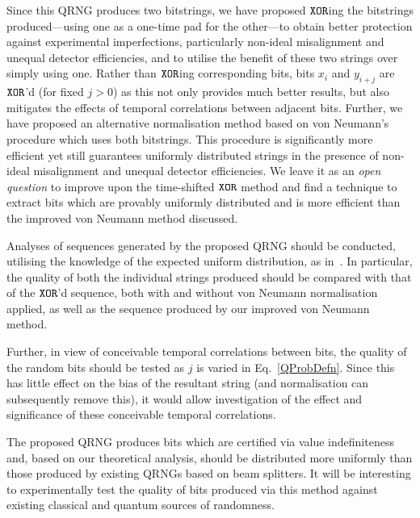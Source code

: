 \documentclass{mscs}
\begin{document}
Since this QRNG produces two bitstrings, we have proposed ${\tt XOR}$ing the bitstrings produced---using one as a one-time pad for the other---to obtain better protection against experimental imperfections, particularly non-ideal misalignment and unequal detector efficiencies, and to utilise the benefit of these two strings over simply using one. Rather than ${\tt XOR}$ing corresponding bits, bits $x_i$ and $y_{i+j}$ are ${\tt XOR}$'d (for fixed $j>0$) as this not only provides much better results, but also mitigates the effects of temporal correlations between adjacent bits. Further, we have proposed an alternative normalisation method based on von Neumann's procedure which uses both bitstrings. This procedure is significantly more efficient yet still guarantees uniformly distributed strings in the presence of non-ideal misalignment and unequal detector efficiencies.
We leave it as an \emph{open question} to improve upon the time-shifted ${\tt XOR}$ method and find a technique to extract bits which are provably uniformly distributed  and is more efficient than the improved von Neumann method discussed.

Analyses of sequences generated by the proposed QRNG should be conducted, utilising the knowledge of the expected uniform distribution, as in~\citet{PhysRevA.82.022102}. In particular, the quality of both the individual strings produced should be compared with that of the ${\tt XOR}$'d sequence, both with and without von Neumann normalisation applied, as well as the sequence produced by our improved von Neumann method.

Further, in view of conceivable temporal correlations between bits, the quality of the random bits should be tested as $j$ is varied in Eq.~\eqref{QProbDefn}. Since this has little effect on the bias of the resultant string (and normalisation can subsequently remove this), it would allow investigation of the effect and significance of these conceivable temporal correlations.


The proposed QRNG produces bits which are certified via value indefiniteness and, based on our theoretical analysis, should be distributed more uniformly than those produced by existing QRNGs based on beam splitters.
 It will be interesting to experimentally test the quality of bits produced via this method against existing classical and quantum sources of randomness.
\end{document}
